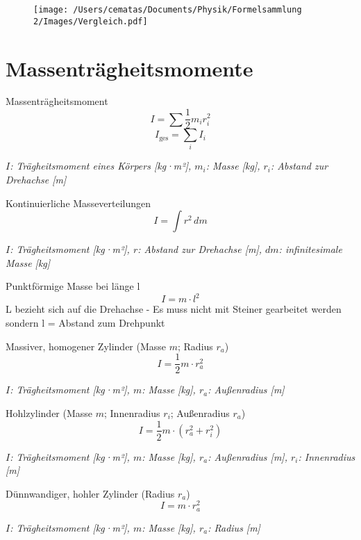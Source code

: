 \documentclass[a4paper,10pt]{article}
\newenvironment{displayformula}
{
	\begin{framed}
		\color{formulaColor}
	}
	{\end{framed}}
\newcommand{\formulalegend}[1]{%
	\par\vspace{0.5ex}%
	{{\color{legendColor}\RaggedRight\small\textit{#1}}}%
	\par\vspace{1.5ex}%
}
\begin{document}
\begin{figure}[h!]
	\centering
	\texttt{[image: /Users/cematas/Documents/Physik/Formelsammlung 2/Images/Vergleich.pdf]}
	\label{fig:beispiel}
\end{figure}

\section{Massenträgheitsmomente}

\begin{displayformula}
	Massenträgheitsmoment
	\[
	I = \sum \frac{1}{2} m_i r_i^2 
	\]
	\[
	I_{\text{ges}} = \sum_i I_i
	\]
\end{displayformula}
\formulalegend{
	\( I \): Trägheitsmoment eines Körpers [kg·m²], \( m_i \): Masse [kg], \( r_i \): Abstand zur Drehachse [m]
}

\begin{displayformula}
	Kontinuierliche Masseverteilungen
	\[
	I = \int r^2 \, dm
	\]
\end{displayformula}
\formulalegend{
	\( I \): Trägheitsmoment [kg·m²], \( r \): Abstand zur Drehachse [m], \( dm \): infinitesimale Masse [kg]
}

\begin{displayformula}
	Punktförmige Masse bei länge l
	\[
	I = m \cdot l^2
	\]
	L bezieht sich auf die Drehachse - Es muss nicht mit Steiner gearbeitet werden sondern l = Abstand zum Drehpunkt
\end{displayformula}
\begin{displayformula}
	Massiver, homogener Zylinder (Masse \( m \); Radius \( r_a \))
	\[
	I = \frac{1}{2} m \cdot r_a^2
	\]
\end{displayformula}
\formulalegend{
	\( I \): Trägheitsmoment [kg·m²], \( m \): Masse [kg], \( r_a \): Außenradius [m]
}

\begin{displayformula}
	Hohlzylinder (Masse \( m \); Innenradius \( r_i \); Außenradius \( r_a \))
	\[
	I = \frac{1}{2} m \cdot (r_a^2 + r_i^2)
	\]
\end{displayformula}
\formulalegend{
	\( I \): Trägheitsmoment [kg·m²], \( m \): Masse [kg], \( r_a \): Außenradius [m], \( r_i \): Innenradius [m]
}

\begin{displayformula}
	Dünnwandiger, hohler Zylinder (Radius \( r_a \))
	\[
	I = m \cdot r_a^2
	\]
\end{displayformula}
\formulalegend{
	\( I \): Trägheitsmoment [kg·m²], \( m \): Masse [kg], \( r_a \): Radius [m]
}
\end{document}
